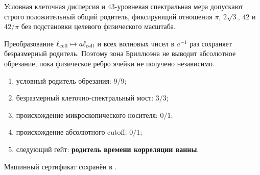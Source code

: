 \begin{theorem}
Условная клеточная дисперсия и 43-уровневая спектральная мера допускают
строго положительный общий родитель, фиксирующий отношения
$\pi$, $2\sqrt3$, $42$ и $42/\pi$ без подстановки целевого физического
масштаба.
\end{theorem}

\begin{nogocriterion}
Преобразование $\ell_{\rm cell}\mapsto a\ell_{\rm cell}$ и всех волновых
чисел в $a^{-1}$ раз сохраняет безразмерный родитель. Поэтому зона
Бриллюэна не выводит абсолютное обрезание, пока физическое ребро ячейки не
получено независимо.
\end{nogocriterion}

\begin{protocol}\begin{enumerate}
\item условный родитель обрезания: \textbf{$9/9$};
\item безразмерный клеточно-спектральный мост: \textbf{$3/3$};
\item происхождение микроскопического носителя: \textbf{$0/1$};
\item происхождение абсолютного cutoff: \textbf{$0/1$};
\item следующий гейт: \textbf{родитель времени корреляции ванны}.
\end{enumerate}\end{protocol}

Машинный сертификат сохранён в
.
